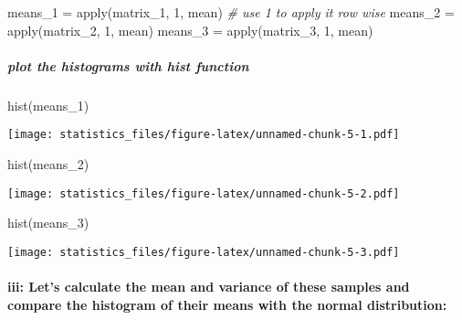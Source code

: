 \documentclass[
]{article}
\newenvironment{Shaded}{\begin{snugshade}}{\end{snugshade}}
\newcommand{\CommentTok}[1]{\textcolor[rgb]{0.56,0.35,0.01}{\textit{#1}}}
\newcommand{\DecValTok}[1]{\textcolor[rgb]{0.00,0.00,0.81}{#1}}
\newcommand{\FunctionTok}[1]{\textcolor[rgb]{0.00,0.00,0.00}{#1}}
\newcommand{\NormalTok}[1]{#1}
\newcommand{\OtherTok}[1]{\textcolor[rgb]{0.56,0.35,0.01}{#1}}
\begin{document}
\begin{Shaded}
\begin{Highlighting}[]
\NormalTok{means\_1 }\OtherTok{=} \FunctionTok{apply}\NormalTok{(matrix\_1, }\DecValTok{1}\NormalTok{, mean) }\CommentTok{\# use 1 to apply it row wise}
\NormalTok{means\_2 }\OtherTok{=} \FunctionTok{apply}\NormalTok{(matrix\_2, }\DecValTok{1}\NormalTok{, mean)}
\NormalTok{means\_3 }\OtherTok{=} \FunctionTok{apply}\NormalTok{(matrix\_3, }\DecValTok{1}\NormalTok{, mean)}
\end{Highlighting}
\end{Shaded}

\hypertarget{plot-the-histograms-with-hist-function}{%
\subparagraph{plot the histograms with hist
function}\label{plot-the-histograms-with-hist-function}}

\begin{Shaded}
\begin{Highlighting}[]
\FunctionTok{hist}\NormalTok{(means\_1)}
\end{Highlighting}
\end{Shaded}

\texttt{[image: statistics\_files/figure-latex/unnamed-chunk-5-1.pdf]}

\begin{Shaded}
\begin{Highlighting}[]
\FunctionTok{hist}\NormalTok{(means\_2)}
\end{Highlighting}
\end{Shaded}

\texttt{[image: statistics\_files/figure-latex/unnamed-chunk-5-2.pdf]}

\begin{Shaded}
\begin{Highlighting}[]
\FunctionTok{hist}\NormalTok{(means\_3)}
\end{Highlighting}
\end{Shaded}

\texttt{[image: statistics\_files/figure-latex/unnamed-chunk-5-3.pdf]}

\hypertarget{iii-lets-calculate-the-mean-and-variance-of-these-samples-and-compare-the-histogram-of-their-means-with-the-normal-distribution}{%
\paragraph{iii: Let's calculate the mean and variance of these samples
and compare the histogram of their means with the normal
distribution:}\label{iii-lets-calculate-the-mean-and-variance-of-these-samples-and-compare-the-histogram-of-their-means-with-the-normal-distribution}}
\end{document}
